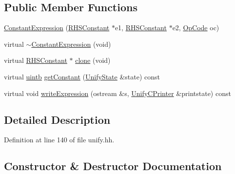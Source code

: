 \subsection*{Public Member Functions}
\begin{DoxyCompactItemize}
\item 
\mbox{\hyperlink{class_constant_expression_ab31fe52f8b8575f9b0a9ae4667227974}{Constant\+Expression}} (\mbox{\hyperlink{class_r_h_s_constant}{R\+H\+S\+Constant}} $\ast$e1, \mbox{\hyperlink{class_r_h_s_constant}{R\+H\+S\+Constant}} $\ast$e2, \mbox{\hyperlink{opcodes_8hh_abeb7dfb0e9e2b3114e240a405d046ea7}{Op\+Code}} oc)
\item 
virtual \mbox{\hyperlink{class_constant_expression_a42359d079393068191c175f95f3d1828}{$\sim$\+Constant\+Expression}} (void)
\item 
virtual \mbox{\hyperlink{class_r_h_s_constant}{R\+H\+S\+Constant}} $\ast$ \mbox{\hyperlink{class_constant_expression_aca0a8cd24e458d11ccfd766a1559215c}{clone}} (void)
\item 
virtual \mbox{\hyperlink{types_8h_a2db313c5d32a12b01d26ac9b3bca178f}{uintb}} \mbox{\hyperlink{class_constant_expression_a13ee63bd84e93851cb1d756be49cc64d}{get\+Constant}} (\mbox{\hyperlink{class_unify_state}{Unify\+State}} \&state) const
\item 
virtual void \mbox{\hyperlink{class_constant_expression_a11af0fadc7f85c3a09431ef92e788870}{write\+Expression}} (ostream \&s, \mbox{\hyperlink{class_unify_c_printer}{Unify\+C\+Printer}} \&printstate) const
\end{DoxyCompactItemize}


\subsection{Detailed Description}


Definition at line 140 of file unify.\+hh.



\subsection{Constructor \& Destructor Documentation}
\mbox{\label{class_constant_expression_ab31fe52f8b8575f9b0a9ae4667227974}} 
